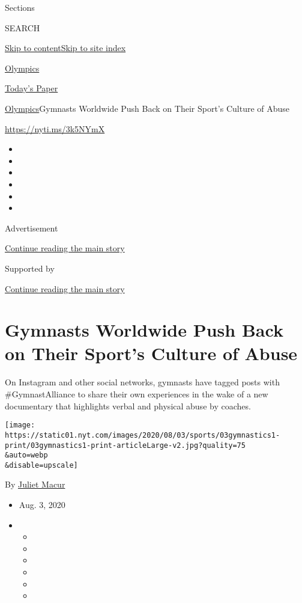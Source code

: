 Sections

SEARCH

\protect\hyperlink{site-content}{Skip to
content}\protect\hyperlink{site-index}{Skip to site index}

\href{https://www.nytimes.com/section/sports/olympics}{Olympics}

\href{https://myaccount.nytimes.com/auth/login?response_type=cookie\&client_id=vi}{}

\href{https://www.nytimes.com/section/todayspaper}{Today's Paper}

\href{/section/sports/olympics}{Olympics}\textbar{}Gymnasts Worldwide
Push Back on Their Sport's Culture of Abuse

\url{https://nyti.ms/3k5NYmX}

\begin{itemize}
\item
\item
\item
\item
\item
\item
\end{itemize}

Advertisement

\protect\hyperlink{after-top}{Continue reading the main story}

Supported by

\protect\hyperlink{after-sponsor}{Continue reading the main story}

\hypertarget{gymnasts-worldwide-push-back-on-their-sports-culture-of-abuse}{%
\section{Gymnasts Worldwide Push Back on Their Sport's Culture of
Abuse}\label{gymnasts-worldwide-push-back-on-their-sports-culture-of-abuse}}

On Instagram and other social networks, gymnasts have tagged posts with
\#GymnastAlliance to share their own experiences in the wake of a new
documentary that highlights verbal and physical abuse by coaches.

\texttt{[image: https://static01.nyt.com/images/2020/08/03/sports/03gymnastics1-print/03gymnastics1-print-articleLarge-v2.jpg?quality=75\\\&auto=webp\\\&disable=upscale]}

By \href{https://www.nytimes.com/by/juliet-macur}{Juliet Macur}

\begin{itemize}
\item
  Aug. 3, 2020
\item
  \begin{itemize}
  \item
  \item
  \item
  \item
  \item
  \item
  \end{itemize}
\end{itemize}

